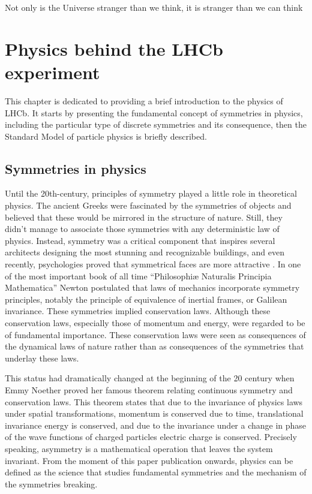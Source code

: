 \begin{savequote}[75mm]
Not only is the Universe stranger than we think, it is stranger than we can think
\end{savequote}


\chapter{Physics behind the LHCb experiment }
This chapter is dedicated to providing a brief introduction to the physics of LHCb. It starts by presenting the fundamental concept of symmetries in physics, including the particular type of discrete symmetries and its consequence, then the Standard Model of particle physics is briefly described. 

\section{Symmetries in physics}
Until the 20th-century, principles of symmetry played a little role in theoretical physics. The ancient Greeks were fascinated by the symmetries of objects and believed that these would be mirrored in the structure of nature. Still, they didn’t manage to associate those symmetries with any deterministic law of physics. Instead, symmetry was a critical component that inspires several architects designing the most stunning and recognizable buildings, and even recently, psychologies proved that symmetrical faces are more attractive \cite{faces}. 
In one of the most important book of all time “Philosophiæ Naturalis Principia Mathematica” \cite{newton} 
Newton postulated that laws of mechanics incorporate symmetry principles, notably the principle of equivalence of inertial frames, or Galilean invariance. These symmetries implied conservation laws. Although these conservation laws, especially those of momentum and energy, were regarded to be of fundamental importance. These conservation laws were seen as consequences of the dynamical laws of nature rather than as consequences of the symmetries that underlay these laws.  

This status had dramatically changed at the beginning of the 20 century when Emmy Noether proved her famous theorem relating continuous symmetry and conservation laws.
This theorem states that due to the invariance of physics laws under spatial transformations, momentum is conserved due to time, translational invariance energy is conserved, and due to the invariance under a change in phase of the wave functions of charged particles electric charge is conserved. Precisely speaking, asymmetry is a mathematical operation that leaves the system invariant. 
From the moment of this paper publication onwards, physics can be defined as the science that studies fundamental symmetries and the mechanism of the symmetries breaking.  

